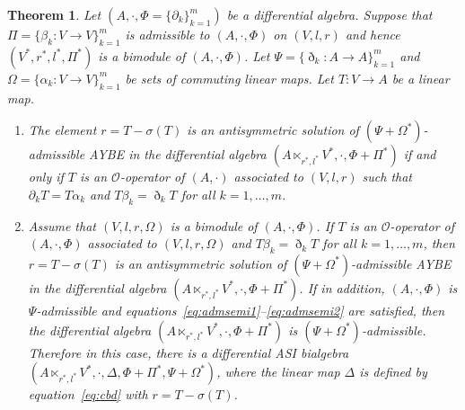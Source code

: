 \documentclass[10pt,a4paper]{amsart}
\numberwithin{equation}{section}
\newtheorem{Theorem}{Theorem}[section]
\begin{document}
\begin{Theorem}\label{thm:aybesemi}
 Let $(A, \cdot, \Phi = \{\partial_k\}_{k=1}^m)$ be a differential algebra.
 Suppose that $\Pi = \{\beta_k\colon V \to V\}_{k=1}^m$ is admissible to $(A, \cdot, \Phi)$ on $(V, l, r)$ and
 hence $(V^*, r^*, l^*, \Pi^*)$ is a bimodule of $(A, \cdot, \Phi)$.
 Let $\Psi = \{\eth_k\colon A \to A\}_{k=1}^m$ and $\Omega = \{\alpha_k\colon V \to V\}_{k=1}^m$ be sets of commuting linear maps.
 Let $T\colon V \to A$ be a linear map.
 \begin{enumerate}\itemsep=0pt
 \item[$1.$] The element $r = T - \sigma(T)$ is an antisymmetric solution of $(\Psi + \Omega^*)$-admissible AYBE in the differential algebra $(A \ltimes_{r^*, l^*}V^*, \cdot, \Phi + \Pi^*)$
 if and only if $T$ is an $\mathcal{O}$-operator of $(A, \cdot)$ associated to $(V, l, r)$ such that $\partial_k T = T \alpha_k$ and $T \beta_k = \eth_k T$ for all $k=1,\dots,m$.

 \item[$2.$] Assume that $(V, l, r, \Omega)$ is a bimodule of $(A, \cdot, \Phi)$.
 If $T$ is an $\mathcal{O}$-operator of $(A, \cdot, \Phi)$ associated to $(V, l, r,\Omega)$ and $T \beta_k = \eth_k T$ for all $k=1, \dots, m$,
 then $r = T - \sigma(T)$ is an antisymmetric solution of $(\Psi + \Omega^*)$-admissible AYBE in the differential algebra $(A \ltimes_{r^*, l^*} V^*, \cdot, \Phi + \Pi^*)$.
 If in addition, $(A, \cdot, \Phi)$ is $\Psi$-admissible and equations~\eqref{eq:admsemi1}--\eqref{eq:admsemi2} are satisfied,
 then the differential algebra $(A \ltimes_{r^*, l^*} V^*, \cdot, \Phi + \Pi^*)$ is $(\Psi + \Omega^*)$-admissible.
 Therefore in this case,
 there is a differential ASI bialgebra $(A \ltimes_{r^*, l^*} V^*, \cdot, \Delta, \Phi + \Pi^*, \Psi + \Omega^*)$,
 where the linear map $\Delta$ is defined by
 equation~\eqref{eq:cbd} with $r=T-\sigma(T)$.
\end{enumerate}
\end{Theorem}
\end{document}
